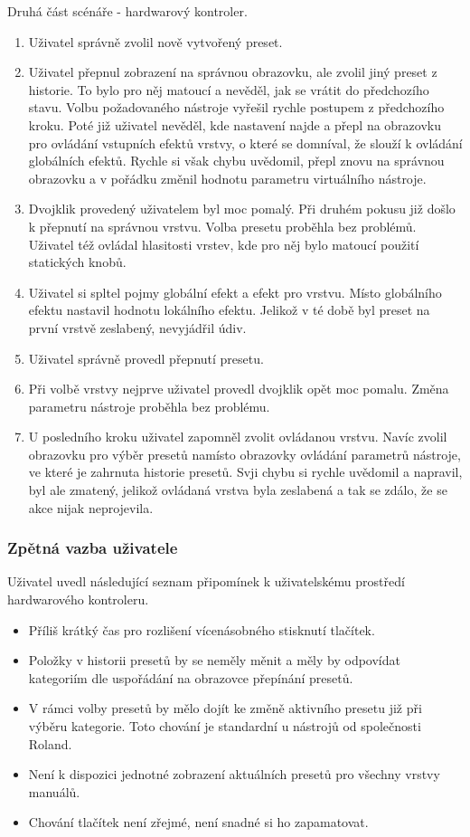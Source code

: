 \documentclass[thesis=M,czech]{FITthesis}[2019/03/06]
\begin{document}
			\noindent
			Druhá část scénáře - hardwarový kontroler.
			\begin{enumerate}
				\item Uživatel správně zvolil nově vytvořený preset.
				\item Uživatel přepnul zobrazení na správnou obrazovku, ale zvolil jiný preset z historie. To bylo pro něj matoucí a nevěděl, jak se vrátit do předchozího stavu. Volbu požadovaného nástroje vyřešil rychle postupem z předchozího kroku.
				Poté již uživatel nevěděl, kde nastavení najde a přepl na obrazovku pro ovládání vstupních efektů vrstvy, o které se domníval, že slouží k ovládání globálních efektů. Rychle si však chybu uvědomil, přepl znovu na správnou obrazovku a v pořádku změnil hodnotu parametru virtuálního nástroje.
				\item Dvojklik provedený uživatelem byl moc pomalý. Při druhém pokusu již došlo k přepnutí na správnou vrstvu.
				Volba presetu proběhla bez problémů. Uživatel též ovládal hlasitosti vrstev, kde pro něj bylo matoucí použití statických knobů.
				\item Uživatel si spltel pojmy globální efekt a efekt pro vrstvu. Místo globálního efektu nastavil hodnotu lokálního efektu. Jelikož v té době byl preset na první vrstvě zeslabený, nevyjádřil údiv.
				\item Uživatel správně provedl přepnutí presetu.
				\item Při volbě vrstvy nejprve uživatel provedl dvojklik opět moc pomalu. Změna parametru nástroje proběhla bez problému.
				\item U posledního kroku uživatel zapomněl zvolit ovládanou vrstvu. Navíc zvolil obrazovku pro výběr presetů namísto obrazovky ovládání parametrů nástroje, ve které je zahrnuta historie presetů. Svji chybu si rychle uvědomil a napravil, byl ale zmatený, jelikož ovládaná vrstva byla zeslabená a tak se zdálo, že se akce nijak neprojevila.
			\end{enumerate}
		
			\subsubsection{Zpětná vazba uživatele}
				Uživatel uvedl následující seznam připomínek k uživatelskému prostředí hardwarového kontroleru.
				\begin{itemize}
					\item Příliš krátký čas pro rozlišení vícenásobného stisknutí tlačítek.
					\item Položky v historii presetů by se neměly měnit a měly by odpovídat kategoriím dle uspořádání na obrazovce přepínání presetů.
					\item V rámci volby presetů by mělo dojít ke změně aktivního presetu již při výběru kategorie. Toto chování je standardní u nástrojů od společnosti Roland.
					\item Není k dispozici jednotné zobrazení aktuálních presetů pro všechny vrstvy manuálů.
					\item Chování tlačítek není zřejmé, není snadné si ho zapamatovat.
				\end{itemize}
			
\end{document}
